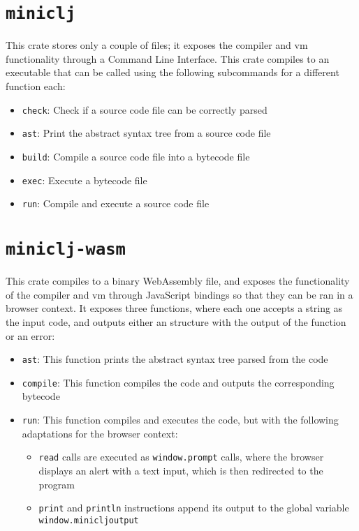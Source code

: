 \documentclass[11pt]{scrreprt}
\begin{document}
\section{\texttt{miniclj}}
This crate stores only a couple of files; it exposes the compiler and vm functionality through a Command Line Interface. This crate compiles to an executable that can be called using the following subcommands for a different function each:
\begin{itemize}
  \item \texttt{check}: Check if a source code file can be correctly parsed
  \item \texttt{ast}: Print the abstract syntax tree from a source code file
  \item \texttt{build}: Compile a source code file into a bytecode file
  \item \texttt{exec}: Execute a bytecode file
  \item \texttt{run}: Compile and execute a source code file
\end{itemize}

\section{\texttt{miniclj-wasm}}
This crate compiles to a binary WebAssembly file, and exposes the functionality of the compiler and vm through JavaScript bindings so that they can be ran in a browser context. It exposes three functions, where each one accepts a string as the input code, and outputs either an structure with the output of the function or an error:
\begin{itemize}
  \item \texttt{ast}: This function prints the abstract syntax tree parsed from the code
  \item \texttt{compile}: This function compiles the code and outputs the corresponding bytecode
  \item \texttt{run}: This function compiles and executes the code, but with the following adaptations for the browser context:
  \begin{itemize}
    \item \texttt{read} calls are executed as \texttt{window.prompt} calls, where the browser displays an alert with a text input, which is then redirected to the program
    \item \texttt{print} and \texttt{println} instructions append its output to the global variable \\\texttt{window.minicljoutput}
  \end{itemize}
\end{itemize}
\end{document}
